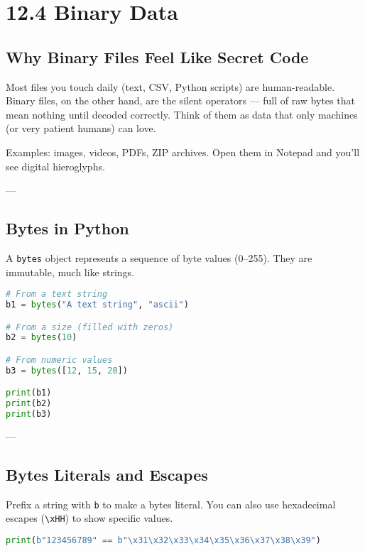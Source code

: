 \chapter{12.4 Binary Data}

\section*{Why Binary Files Feel Like Secret Code}

Most files you touch daily (text, CSV, Python scripts) are human-readable.  
Binary files, on the other hand, are the silent operators — full of raw bytes that mean nothing
until decoded correctly. Think of them as data that only machines (or very patient humans)
can love.

Examples: images, videos, PDFs, ZIP archives.  
Open them in Notepad and you’ll see digital hieroglyphs.

---

\section{Bytes in Python}

A \texttt{bytes} object represents a sequence of byte values (0--255).  
They are immutable, much like strings.

\begin{lstlisting}[language=Python, caption={Creating bytes in different ways.}]
# From a text string
b1 = bytes("A text string", "ascii")

# From a size (filled with zeros)
b2 = bytes(10)

# From numeric values
b3 = bytes([12, 15, 20])

print(b1)
print(b2)
print(b3)
\end{lstlisting}

---

\section{Bytes Literals and Escapes}

Prefix a string with \texttt{b} to make a bytes literal.
You can also use hexadecimal escapes (\texttt{\textbackslash xHH}) to show specific values.

\begin{lstlisting}[language=Python, caption={Byte literals and hex escapes.}]
print(b"123456789" == b"\x31\x32\x33\x34\x35\x36\x37\x38\x39")
\end{lstlisting}

